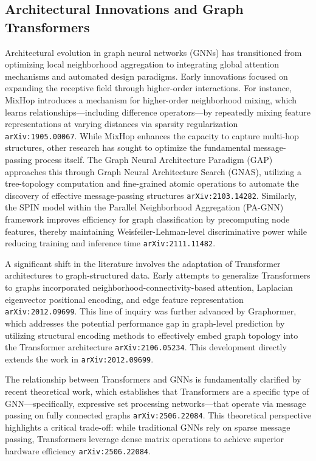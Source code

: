 \documentclass[11pt]{article}
\begin{document}
\subsection{Architectural Innovations and Graph Transformers}

Architectural evolution in graph neural networks (GNNs) has transitioned from optimizing local neighborhood aggregation to integrating global attention mechanisms and automated design paradigms. Early innovations focused on expanding the receptive field through higher-order interactions. For instance, MixHop introduces a mechanism for higher-order neighborhood mixing, which learns relationships—including difference operators—by repeatedly mixing feature representations at varying distances via sparsity regularization \texttt{arXiv:1905.00067}. While MixHop enhances the capacity to capture multi-hop structures, other research has sought to optimize the fundamental message-passing process itself. The Graph Neural Architecture Paradigm (GAP) approaches this through Graph Neural Architecture Search (GNAS), utilizing a tree-topology computation and fine-grained atomic operations to automate the discovery of effective message-passing structures \texttt{arXiv:2103.14282}. Similarly, the SPIN model within the Parallel Neighborhood Aggregation (PA-GNN) framework improves efficiency for graph classification by precomputing node features, thereby maintaining Weisfeiler-Lehman-level discriminative power while reducing training and inference time \texttt{arXiv:2111.11482}.

A significant shift in the literature involves the adaptation of Transformer architectures to graph-structured data. Early attempts to generalize Transformers to graphs incorporated neighborhood-connectivity-based attention, Laplacian eigenvector positional encoding, and edge feature representation \texttt{arXiv:2012.09699}. This line of inquiry was further advanced by Graphormer, which addresses the potential performance gap in graph-level prediction by utilizing structural encoding methods to effectively embed graph topology into the Transformer architecture \texttt{arXiv:2106.05234}. This development directly extends the work in \texttt{arXiv:2012.09699}.

The relationship between Transformers and GNNs is fundamentally clarified by recent theoretical work, which establishes that Transformers are a specific type of GNN—specifically, expressive set processing networks—that operate via message passing on fully connected graphs \texttt{arXiv:2506.22084}. This theoretical perspective highlights a critical trade-off: while traditional GNNs rely on sparse message passing, Transformers leverage dense matrix operations to achieve superior hardware efficiency \texttt{arXiv:2506.22084}.
\end{document}
